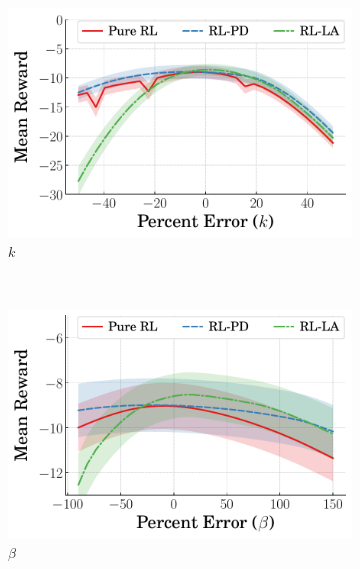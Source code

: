 \begin{figure}[t]
    \centering
    \begin{subfigure}[b]{0.49\textwidth}
        \centering
        \includegraphics[width=\textwidth]{figures/figures_robustness/duffing_robustness/k_robustness.pdf}
        \caption{$k$}
        \label{subfig_chap4:duffing_k_robustness}
    \end{subfigure}\\
    \hfill
    \begin{subfigure}[b]{0.49\textwidth}
        \centering
        \includegraphics[width=\textwidth]{figures/figures_robustness/duffing_robustness/Beta_robustness.pdf}
        \caption{$\beta$}
        \label{subfig_chap4:duffing_Beta_robustness}
    \end{subfigure}
    \hfill
    \begin{subfigure}[b]{0.49\textwidth}
        \centering

\end{subfigure}
\end{figure}
